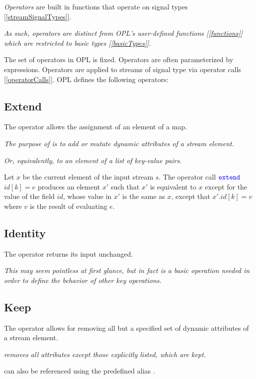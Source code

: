 \documentclass{article}
\begin{document}
{\em Operators} are built in functions that operate on signal types [\ref{streamSignalTypes}]. 

{\em 
As such, operators are distinct from OPL's user-defined functions [\ref{functions}] which are restricted to basic types [\ref{basicTypes}].
}

The set of operators in OPL  is fixed. Operators  are often parameterized by expressions. Operators are applied to streams of signal type  via operator calls [\ref{operatorCalls}]. OPL defines the following operators:

\subsection{Extend}
\label{extend}

The \EXTEND{} operator allows the assignment of an element of a map.

{\em The purpose of \EXTEND{} is to add or mutate dynamic attributes of a stream element.}

{\em Or, equivalently, to an element of a list of key-value pairs.}

Let $x$ be the current element of the input stream $s$. The operator call $\texttt{\color{blue} extend}{}$  $id[k] = e$ produces an element $x'$ such that $x'$ is equivalent to $x$ except for the value of the field $id$, whose value in $x'$ is the same as $x$, except that $x'.id[k] = v$ where $v$ is the result of evaluating $e$.

\subsection{Identity}
\label{identity}

The \IDENTITY{} operator returns its input unchanged.

{\em This may seem pointless at first glance, but in fact is a basic operation needed in order to define the behavior of other key operations.}

\subsection{Keep}
\label{keep}

The \KEEP{} operator allows for removing all but a specified set of dynamic attributes of a stream element.

{\em \KEEP{} removes all attributes except those explicitly listed, which are kept.}

\KEEP{} can also be referenced using the predefined alias \PROJECTKEEP.
\end{document}
